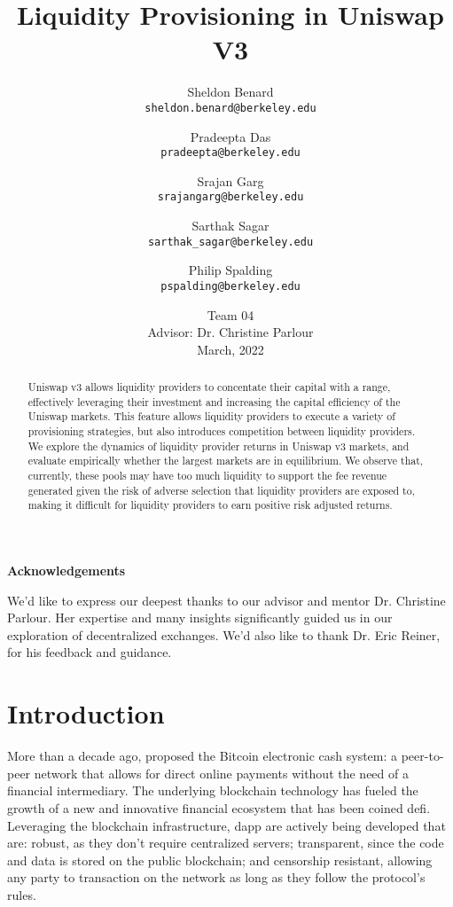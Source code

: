 \documentclass[11pt]{article}
\title{\textbf{Liquidity Provisioning in Uniswap V3}}
\author{
Sheldon Benard \\
\texttt{sheldon.benard@berkeley.edu} \and
Pradeepta Das \\
\texttt{pradeepta@berkeley.edu} \and
Srajan Garg \\
\texttt{srajangarg@berkeley.edu} \and
Sarthak Sagar \\
\texttt{sarthak\_sagar@berkeley.edu} \and
Philip Spalding \\
\texttt{pspalding@berkeley.edu}
}
\date{
\vspace{2cm}Team 04 \\
Advisor: Dr. Christine Parlour\\
\vspace{2cm}March, 2022
}
\begin{document}
\maketitle

\vspace{1cm}
\begin{abstract}
\noindent Uniswap v3 allows liquidity providers to concentate their capital with a range, effectively leveraging their investment and increasing the capital efficiency of the Uniswap markets. This feature allows liquidity providers to execute a variety of provisioning strategies, but also introduces competition between liquidity providers. We explore the dynamics of liquidity provider returns in Uniswap v3 markets, and evaluate empirically whether the largest markets are in equilibrium. We observe that, currently, these pools may have too much liquidity to support the fee revenue generated given the risk of adverse selection that liquidity providers are exposed to, making it difficult for liquidity providers to earn positive risk adjusted returns.
\end{abstract}
\thispagestyle{empty}

\clearpage
\hspace{0pt}
\vfill
\begin{center}
    \textbf{Acknowledgements}
\end{center}
We'd like to express our deepest thanks to our advisor and mentor Dr. Christine Parlour. Her expertise and many insights significantly guided us in our exploration of decentralized exchanges. We'd also like to thank Dr. Eric Reiner, for his feedback and guidance.
\vfill
\hspace{0pt}
\thispagestyle{empty}

\clearpage
\tableofcontents
\thispagestyle{empty}

\clearpage
\printglossary[type=\acronymtype,nonumberlist,nopostdot]
\thispagestyle{empty}

\clearpage
\doublespacing
{}

\section{Introduction}\label{sec:1}

More than a decade ago, \cite{Bitcoin} proposed the Bitcoin electronic cash system: a peer-to-peer network that allows for direct online payments without the need of a financial intermediary. The underlying \gls{blockchain} technology has fueled the growth of a new and innovative financial ecosystem that has been coined \gls{defi}. Leveraging the \gls{blockchain} infrastructure, \gls{dapp} are actively being developed that are: robust, as they don't require centralized servers; transparent, since the code and data is stored on the public blockchain; and censorship resistant, allowing any party to transaction on the network as long as they follow the protocol's rules.
\end{document}
